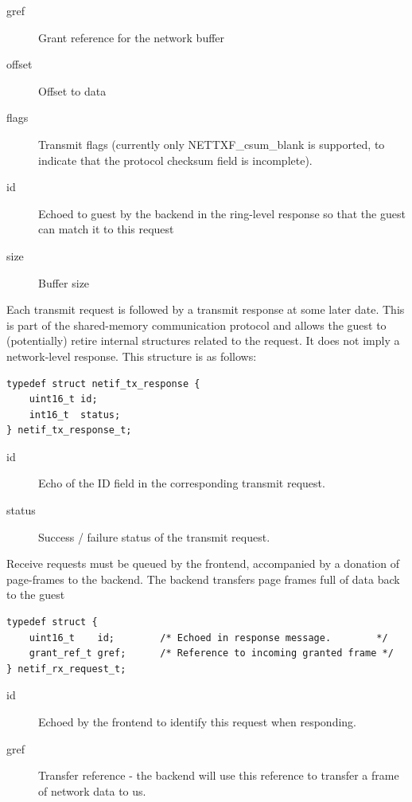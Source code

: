 \documentclass[11pt,twoside,final,openright]{report}
\begin{document}
\begin{description}
\item[gref] Grant reference for the network buffer
\item[offset] Offset to data
\item[flags] Transmit flags (currently only NETTXF\_csum\_blank is
  supported, to indicate that the protocol checksum field is
  incomplete).
\item[id] Echoed to guest by the backend in the ring-level response so
  that the guest can match it to this request
\item[size] Buffer size
\end{description}

Each transmit request is followed by a transmit response at some later
date.  This is part of the shared-memory communication protocol and
allows the guest to (potentially) retire internal structures related
to the request.  It does not imply a network-level response.  This
structure is as follows:

\scriptsize
\begin{verbatim}
typedef struct netif_tx_response {
    uint16_t id;
    int16_t  status;
} netif_tx_response_t;
\end{verbatim}
\normalsize

\begin{description}
\item[id] Echo of the ID field in the corresponding transmit request.
\item[status] Success / failure status of the transmit request.
\end{description}

Receive requests must be queued by the frontend, accompanied by a
donation of page-frames to the backend.  The backend transfers page
frames full of data back to the guest

\scriptsize
\begin{verbatim}
typedef struct {
    uint16_t    id;        /* Echoed in response message.        */
    grant_ref_t gref;      /* Reference to incoming granted frame */
} netif_rx_request_t;
\end{verbatim}
\normalsize

\begin{description}
\item[id] Echoed by the frontend to identify this request when
  responding.
\item[gref] Transfer reference - the backend will use this reference
  to transfer a frame of network data to us.
\end{description}
\end{document}
